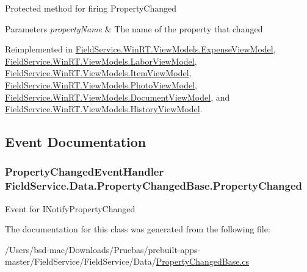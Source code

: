 Protected method for firing Property\+Changed 


\begin{DoxyParams}{Parameters}
{\em property\+Name} & The name of the property that changed\\
\hline
\end{DoxyParams}


Reimplemented in \hyperlink{class_field_service_1_1_win_r_t_1_1_view_models_1_1_expense_view_model_a6bf375b7117515d88f91a24d40917db1}{Field\+Service.\+Win\+R\+T.\+View\+Models.\+Expense\+View\+Model}, \hyperlink{class_field_service_1_1_win_r_t_1_1_view_models_1_1_labor_view_model_a4750a450d53285bb3987a2207eab9360}{Field\+Service.\+Win\+R\+T.\+View\+Models.\+Labor\+View\+Model}, \hyperlink{class_field_service_1_1_win_r_t_1_1_view_models_1_1_item_view_model_a04f564001759402cb74031112a33636d}{Field\+Service.\+Win\+R\+T.\+View\+Models.\+Item\+View\+Model}, \hyperlink{class_field_service_1_1_win_r_t_1_1_view_models_1_1_photo_view_model_a44fe6751c9c968a39e93d5484f0e821c}{Field\+Service.\+Win\+R\+T.\+View\+Models.\+Photo\+View\+Model}, \hyperlink{class_field_service_1_1_win_r_t_1_1_view_models_1_1_document_view_model_a11fd2d66d52e6009d58ed917669f5799}{Field\+Service.\+Win\+R\+T.\+View\+Models.\+Document\+View\+Model}, and \hyperlink{class_field_service_1_1_win_r_t_1_1_view_models_1_1_history_view_model_aa2442739713b5660e32190dfb08bb095}{Field\+Service.\+Win\+R\+T.\+View\+Models.\+History\+View\+Model}.



\subsection{Event Documentation}
\hypertarget{class_field_service_1_1_data_1_1_property_changed_base_a4e280ec984d9d0584222d973895ff3ed}{
\subsubsection[{Property\+Changed}]{\setlength{\rightskip}{0pt plus 5cm}Property\+Changed\+Event\+Handler Field\+Service.\+Data.\+Property\+Changed\+Base.\+Property\+Changed}}\label{class_field_service_1_1_data_1_1_property_changed_base_a4e280ec984d9d0584222d973895ff3ed}


Event for I\+Notify\+Property\+Changed 



The documentation for this class was generated from the following file\+:\begin{DoxyCompactItemize}
\item 
/\+Users/bsd-\/mac/\+Downloads/\+Pruebas/prebuilt-\/apps-\/master/\+Field\+Service/\+Field\+Service/\+Data/\hyperlink{_property_changed_base_8cs}{Property\+Changed\+Base.\+cs}\end{DoxyCompactItemize}
